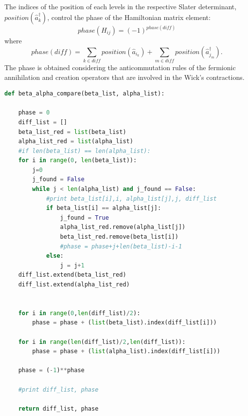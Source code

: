 \documentclass[twoside]{article}
\newcommand{\bra}[1]{\langle #1 |}
\newcommand{\ket}[1]{| #1 \rangle}
\begin{document}
The indices of the position of each levels in the respective Slater determinant, $position(\hat a_{k}^\dagger)$, control the phase of the Hamiltonian matrix element:
\begin{equation}
phase(H_{ij}) = (-1)^{phase(diff)} 
\end{equation}
where
\begin{equation}
phase(diff)=\sum_{k \in diff} position(\hat a_{i_k})+\sum_{m \in diff} position(\hat a_{j_m}^\dagger).
\end{equation}
The phase is obtained considering the anticommutation rules of the fermionic annihilation and creation operators that are involved in the Wick's contractions.

\smallskip
\begin{lstlisting}[language=Python,label=compare, caption=\texttt{beta\_alpha\_compare} is a function in the module \texttt{compare.py} that makes a comparison between $\protect{\bra{\Phi_\beta}}$ and $\protect{\ket{\Phi_\alpha}}$ to determine their difference in terms of single-particle states.]
def beta_alpha_compare(beta_list, alpha_list):
    
    phase = 0
    diff_list = []
    beta_list_red = list(beta_list)
    alpha_list_red = list(alpha_list)
    #if len(beta_list) == len(alpha_list):
    for i in range(0, len(beta_list)):
        j=0
        j_found = False
        while j < len(alpha_list) and j_found == False:
            #print beta_list[i],i, alpha_list[j],j, diff_list
            if beta_list[i] == alpha_list[j]:
                j_found = True
                alpha_list_red.remove(alpha_list[j])
                beta_list_red.remove(beta_list[i])
                #phase = phase+j+len(beta_list)-i-1
            else:
                j = j+1
    diff_list.extend(beta_list_red)
    diff_list.extend(alpha_list_red)


    for i in range(0,len(diff_list)/2):
    	phase = phase + (list(beta_list).index(diff_list[i]))
 
    for i in range(len(diff_list)/2,len(diff_list)):
        phase = phase + (list(alpha_list).index(diff_list[i]))
        
    phase = (-1)**phase

    #print diff_list, phase
    
    return diff_list, phase

\end{lstlisting}
\end{document}
